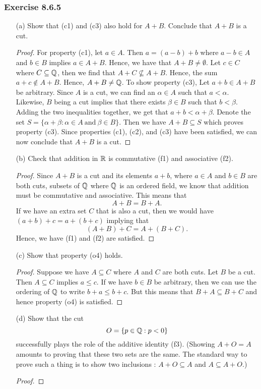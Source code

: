 \subsubsection{Exercise 8.6.5} 
\begin{enumerate}
    \item[(a)] Show that (c1) and (c3) also hold for \( A + B  \). Conclude that \( A +  B \) is a cut.
        \begin{proof}
        For property (c1), let \( a \in A  \). Then \( a = (a-b) + b \) where \( a -b \in A  \) and \( b \in B  \) implies \( a \in A + B  \). Hence, we have that \( A + B \neq \emptyset \). Let \(  c \in C  \) where \( C \subseteq \mathbb{Q}   \), then we find that \( A + C \not\subseteq A + B  \). Hence, the sum \( a+c \notin A + B \). Hence, \( A + B \neq \mathbb{Q}  \). 
        To show property (c3), Let \( a + b \in A +  B  \) be arbitrary. Since \( A  \) is a cut, we can find an \( \alpha \in A \) such that \( a < \alpha  \). Likewise, \( B  \) being a cut implies that there exists \( \beta \in B  \) such that \( b < \beta \). Adding the two inequalities together, we get that \(  a+b < \alpha + \beta \). Denote the set \( S = \{ \alpha + \beta : \alpha \in A \ \text{and} \ \beta \in B  \}  \). Then we have \( A + B \subseteq S  \) which proves property (c3). Since properties (c1), (c2), and (c3) have been satisfied, we can now conclude that \( A + B  \) is a cut.
        \end{proof}
    \item[(b)] Check that addition in \( \mathbb{R}  \) is commutative (f1) and associative (f2).
        \begin{proof}
        Since \( A + B  \) is a cut and its elements \( a + b   \), where \( a \in A  \) and \( b \in B  \) are both cuts, subsets of \( \mathbb{Q}  \) where \( \mathbb{Q}  \) is an ordered field, we know that addition must be commutative and associative. This means that 
        \[  A + B = B + A.\] If we have an extra set \( C  \) that is also a cut, then we would have \( (a+b) + c = a + (b+c)  \) implying that 
        \[  (A+B) + C = A + (B+C). \] 
        Hence, we have (f1) and (f2) are satisfied.
        \end{proof}
    \item[(c)] Show that property (o4) holds.
        \begin{proof}
        Suppose we have \( A \subseteq C  \) where \( A  \) and \( C  \) are both cuts.         Let \( B  \) be a cut. Then \( A \subseteq C \) implies \( a \leq c  \). If we have \( b \in B  \) be arbitrary, then we can use the ordering of \( \mathbb{Q}  \) to write \( b + a \leq b + c  \). But this means that \(  B + A \subseteq B + C  \) and hence property (o4) is satisfied.
        \end{proof}
    \item[(d)] Show that the cut 
        \[  O = \{ p \in \mathbb{Q} : p < 0  \}  \] successfully plays the role of the additive identity (f3). (Showing \( A + O = A  \) amounts to proving that these two sets are the same. The standard way to prove such a thing is to show two inclusions : \( A  + O \subseteq A  \) and \( A \subseteq A + O  \).) 
        \begin{proof}
        

\end{proof}
\end{enumerate}
